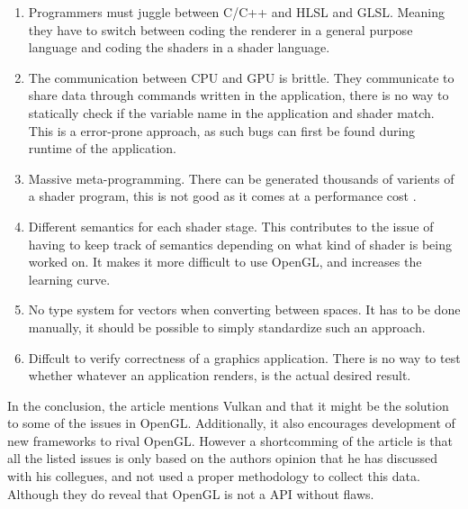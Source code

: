 \begin{enumerate}
\item Programmers must juggle between C/C++ and \gls{HLSL} and \gls{GLSL}.
Meaning they have to switch between coding the renderer in a general purpose language and coding the shaders in a shader language.

\item The communication between \gls{CPU} and \gls{GPU} is brittle. 
They communicate to share data through commands written in the application, there is no way to statically check if the variable name in the application and shader match.
This is a error-prone approach, as such bugs can first be found during runtime of the application. 

\item Massive meta-programming. 
There can be generated thousands of varients of a shader program, this is not good as it comes at a performance cost . 

\item Different semantics for each shader stage. 
This contributes to the issue of having to keep track of semantics depending on what kind of shader is being worked on.
It makes it more difficult to use OpenGL, and increases the learning curve. 

\item No type system for vectors when converting between spaces. 
It has to be done manually, it should be possible to simply standardize such an approach.

\item Diffcult to verify correctness of a graphics application. 
There is no way to test whether whatever an application renders, is the actual desired result.
\end{enumerate}

In the conclusion, the article mentions Vulkan and that it might be the solution to some of the issues in OpenGL. 
Additionally, it also encourages development of new frameworks to rival OpenGL. 
However a shortcomming of the article is that all the listed issues is only based on the authors opinion that he has discussed with his collegues, and not used a proper methodology to collect this data. 
Although they do reveal that OpenGL is not a \gls{API} without flaws.

